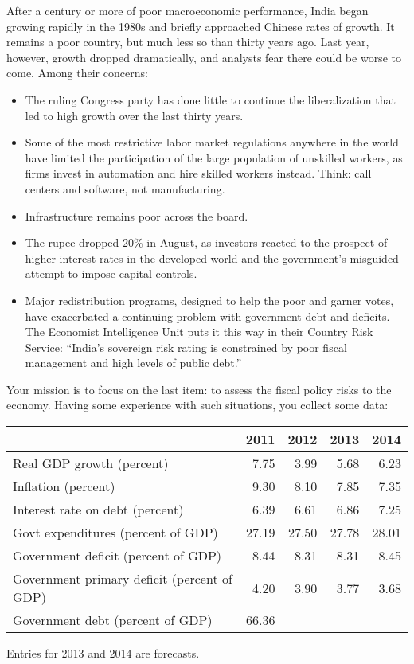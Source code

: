\documentclass[12pt]{exam}
\begin{document}
\begin{questions}
\begin{solution}
\begin{parts}
\end{parts}
\end{solution}


%
After a century or more of poor macroeconomic performance,
India began growing rapidly in the 1980s and briefly approached Chinese rates of growth.
It remains a poor country, but much less so than thirty years ago.
Last year, however, growth dropped dramatically,
and analysts fear there could be worse to come.
Among their concerns:
\begin{itemize}
\item The ruling Congress party has done little to continue
the liberalization that led to high growth over the last thirty years.
\item Some of the most restrictive labor market regulations
anywhere in the world have limited the participation
of the large population of unskilled workers,
as firms invest in automation and hire skilled workers instead.
Think:  call centers and software, not manufacturing.
\item Infrastructure remains poor across the board.
\item The rupee dropped 20\% in August, as investors reacted
to the prospect of higher interest rates in the developed world
and the government's misguided attempt to impose capital controls.
\item Major redistribution programs, designed to help the poor and garner votes,
have exacerbated a continuing problem with government debt and deficits.
The Economist Intelligence Unit puts it this way in their Country Risk Service:
``India's sovereign risk rating
is constrained by poor fiscal management and high levels of public debt.''
\end{itemize}

Your mission is to focus on the last item:
to assess the fiscal policy risks to the economy.
Having some experience with such situations,
you collect some data:
%
\begin{center}
\begin{tabular}{lrrrr}
\toprule
         & 2011 &  2012  &  2013 & 2014  \\%
\midrule
Real GDP growth (percent)	& 7.75 & 3.99 & 5.68 & 6.23 \\
Inflation (percent)			& 9.30 & 8.10 &	7.85 & 7.35 \\
Interest rate on debt (percent) & 6.39 & 6.61 & 6.86 & 7.25 \\
Govt expenditures (percent of GDP) & 27.19 & 27.50 & 27.78 & 28.01 \\
Government deficit (percent of GDP) & 8.44 & 8.31 & 8.31 & 8.45 \\
Government primary deficit (percent of GDP)	& 4.20 & 3.90 & 3.77 & 3.68 \\
Government debt (percent of GDP) & 66.36	\\ %
\bottomrule
\end{tabular}
\end{center}
Entries for 2013 and 2014 are forecasts.


\end{questions}
\end{document}
